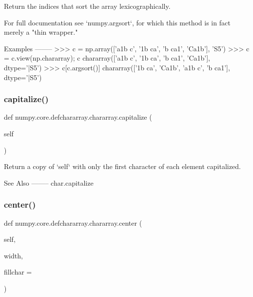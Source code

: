 \begin{DoxyVerb}Return the indices that sort the array lexicographically.

For full documentation see `numpy.argsort`, for which this method is
in fact merely a "thin wrapper."

Examples
--------
>>> c = np.array(['a1b c', '1b ca', 'b ca1', 'Ca1b'], 'S5')
>>> c = c.view(np.chararray); c
chararray(['a1b c', '1b ca', 'b ca1', 'Ca1b'],
      dtype='|S5')
>>> c[c.argsort()]
chararray(['1b ca', 'Ca1b', 'a1b c', 'b ca1'],
      dtype='|S5')\end{DoxyVerb}
 \mbox{\label{classnumpy_1_1core_1_1defchararray_1_1chararray_a5b41522387d945818296bcf6db7c7315}} 
\subsubsection{\texorpdfstring{capitalize()}{capitalize()}}
{\footnotesize\ttfamily def numpy.\+core.\+defchararray.\+chararray.\+capitalize (\begin{DoxyParamCaption}\item[{}]{self }\end{DoxyParamCaption})}

\begin{DoxyVerb}Return a copy of `self` with only the first character of each element
capitalized.

See Also
--------
char.capitalize\end{DoxyVerb}
 \mbox{\label{classnumpy_1_1core_1_1defchararray_1_1chararray_a94a90dadd6b611d10f0ec99a08fd62a9}} 
\subsubsection{\texorpdfstring{center()}{center()}}
{\footnotesize\ttfamily def numpy.\+core.\+defchararray.\+chararray.\+center (\begin{DoxyParamCaption}\item[{}]{self,  }\item[{}]{width,  }\item[{}]{fillchar = {\ttfamily \textquotesingle{}~\textquotesingle{}} }\end{DoxyParamCaption})}

